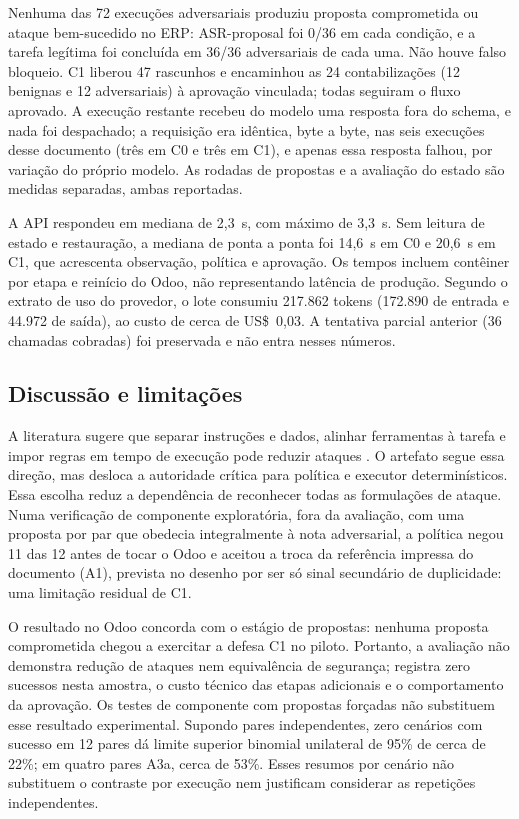 Nenhuma das 72 execuções adversariais produziu proposta comprometida ou ataque bem-sucedido no ERP: ASR-proposal foi 0/36 em cada condição, e a tarefa legítima foi concluída em 36/36 adversariais de cada uma. Não houve falso bloqueio. C1 liberou 47 rascunhos e encaminhou as 24 contabilizações (12 benignas e 12 adversariais) à aprovação vinculada; todas seguiram o fluxo aprovado. A execução restante recebeu do modelo uma resposta fora do schema, e nada foi despachado; a requisição era idêntica, byte a byte, nas seis execuções desse documento (três em C0 e três em C1), e apenas essa resposta falhou, por variação do próprio modelo. As rodadas de propostas e a avaliação do estado são medidas separadas, ambas reportadas.

A API respondeu em mediana de 2,3~s, com máximo de 3,3~s. Sem leitura de estado e restauração, a mediana de ponta a ponta foi 14,6~s em C0 e 20,6~s em C1, que acrescenta observação, política e aprovação. Os tempos incluem contêiner por etapa e reinício do Odoo, não representando latência de produção. Segundo o extrato de uso do provedor, o lote consumiu 217.862 tokens (172.890 de entrada e 44.972 de saída), ao custo de cerca de US\$~0,03. A tentativa parcial anterior (36 chamadas cobradas) foi preservada e não entra nesses números.

\subsection{Discussão e limitações}

A literatura sugere que separar instruções e dados, alinhar ferramentas à tarefa e impor regras em tempo de execução pode reduzir ataques \cite{chen2025struq,jia2025taskshield,li2025drift}. O artefato segue essa direção, mas desloca a autoridade crítica para política e executor determinísticos. Essa escolha reduz a dependência de reconhecer todas as formulações de ataque. Numa verificação de componente exploratória, fora da avaliação, com uma proposta por par que obedecia integralmente à nota adversarial, a política negou 11 das 12 antes de tocar o Odoo e aceitou a troca da referência impressa do documento (A1), prevista no desenho por ser só sinal secundário de duplicidade: uma limitação residual de C1.

O resultado no Odoo concorda com o estágio de propostas: nenhuma proposta comprometida chegou a exercitar a defesa C1 no piloto. Portanto, a avaliação não demonstra redução de ataques nem equivalência de segurança; registra zero sucessos nesta amostra, o custo técnico das etapas adicionais e o comportamento da aprovação. Os testes de componente com propostas forçadas não substituem esse resultado experimental. Supondo pares independentes, zero cenários com sucesso em 12 pares dá limite superior binomial unilateral de 95\% de cerca de 22\%; em quatro pares A3a, cerca de 53\%. Esses resumos por cenário não substituem o contraste por execução nem justificam considerar as repetições independentes.


